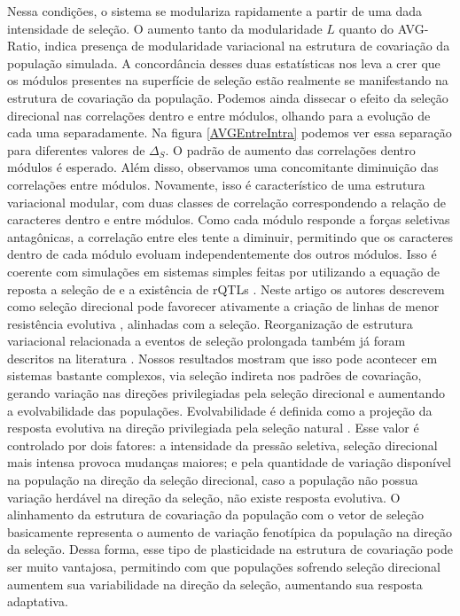 Nessa condições, o sistema se modulariza rapidamente a partir de uma dada
intensidade de seleção.
O aumento tanto da modularidade $L$ quanto do AVG-Ratio, indica presença
de modularidade variacional na estrutura de covariação da população
simulada.
A concordância desses duas estatísticas nos leva a crer que os módulos
presentes na superfície de seleção estão realmente se manifestando na
estrutura de covariação da população.
Podemos ainda dissecar o efeito da seleção direcional nas correlações
dentro e entre módulos, olhando para a evolução de cada uma
separadamente. 
Na figura \ref{AVGEntreIntra} podemos ver essa separação para diferentes
valores de $\Delta_S$. 
O padrão de aumento das correlações dentro módulos é esperado. 
Além disso, observamos uma concomitante diminuição das correlações entre
módulos. 
Novamente, isso é característico de uma estrutura variacional modular,
com duas classes de correlação correspondendo a relação de caracteres
dentro e entre módulos.
Como cada módulo responde a forças seletivas antagônicas, a correlação
entre eles tente a diminuir, permitindo que os caracteres dentro de cada
módulo evoluam independentemente dos outros módulos. 
Isso é coerente com simulações em sistemas simples feitas por
\cite{Pavlicev2010} utilizando a equação
de reposta a seleção de \cite{Lande1979} e a existência de rQTLs
\citep{Pavlicev2008a}. 
Neste artigo os autores descrevem como seleção direcional pode favorecer
ativamente a criação de linhas de menor resistência evolutiva
\citep[direções do espaço morfológico ricas em
variação, veja][]{Schluter1996},  alinhadas com a seleção. 
Reorganização de estrutura variacional relacionada a eventos de seleção
prolongada também já foram descritos na literatura \citep{Berg1960,
Young2005, Young2010, Grabowski2011}. 
Nossos resultados mostram que isso pode acontecer em sistemas
bastante complexos, via seleção indireta nos padrões de
covariação, gerando variação nas direções privilegiadas pela seleção
direcional e aumentando a evolvabilidade das populações. 
Evolvabilidade é definida como a projeção da resposta evolutiva na
direção privilegiada pela seleção natural \citep{Hansen2008}.
Esse valor é controlado por dois fatores: a intensidade da pressão
seletiva, seleção direcional mais intensa provoca mudanças maiores; e
pela quantidade de variação disponível na população na direção da
seleção direcional, caso a população não possua variação herdável na
direção da seleção, não existe resposta evolutiva.
O alinhamento da estrutura de covariação da população com o vetor de
seleção basicamente representa o aumento de variação fenotípica da
população na direção da seleção.
Dessa forma, esse tipo de plasticidade na estrutura de covariação pode
ser muito vantajosa, permitindo com que populações sofrendo seleção
direcional aumentem sua variabilidade na direção da seleção, aumentando
sua resposta adaptativa.

